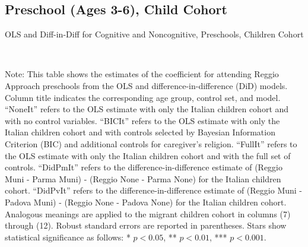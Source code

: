 

\begin{landscape}
\subsection{Preschool (Ages 3-6), Child Cohort}

\begin{table}[H] \caption{OLS and Diff-in-Diff for Cognitive and Noncognitive, Preschools, Children Cohort} \label{ols-E-reg}
\scalebox{0.80}{}
\vspace{1ex} \\
\footnotesize\raggedright{Note: This table shows the estimates of the coefficient for attending Reggio Approach preschools from the OLS and difference-in-difference (DiD) models. Column title indicates the corresponding age group, control set, and model. ``NoneIt'' refers to the OLS estimate with only the Italian children cohort and with no control variables. ``BICIt'' refers to the OLS estimate with only the Italian children cohort and with controls selected by Bayesian Information Criterion (BIC) and additional controls for caregiver's religion. ``FullIt'' refers to the OLS estimate with only the Italian children cohort and with the full set of controls. ``DidPmIt'' refers to the difference-in-difference estimate of (Reggio Muni - Parma Muni) - (Reggio None - Parma None) for the Italian children cohort. ``DidPvIt'' refers to the difference-in-difference estimate of (Reggio Muni - Padova Muni) - (Reggio None - Padova None) for the Italian children cohort.  Analogous meanings are applied to the migrant children cohort in columns (7) through (12). Robust standard errors are reported in parentheses. Stars show statistical significance as follows: * $p < 0.05$, ** $p < 0.01$, *** $p < 0.001$.}
\end{table}


\end{landscape}
